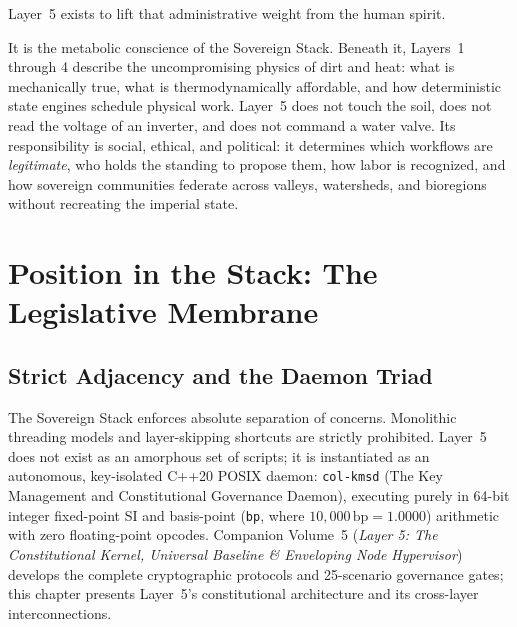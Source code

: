 Layer~5 exists to lift that administrative weight from the human spirit.

It is the metabolic conscience of the Sovereign Stack. Beneath it, Layers~1 through 4 describe the uncompromising physics of dirt and heat: what is mechanically true, what is thermodynamically affordable, and how deterministic state engines schedule physical work. Layer~5 does not touch the soil, does not read the voltage of an inverter, and does not command a water valve. Its responsibility is social, ethical, and political: it determines which workflows are \textit{legitimate}, who holds the standing to propose them, how labor is recognized, and how sovereign communities federate across valleys, watersheds, and bioregions without recreating the imperial state.

\section{Position in the Stack: The Legislative Membrane}
\label{sec:l5-position}

\subsection{Strict Adjacency and the Daemon Triad}

The Sovereign Stack enforces absolute separation of concerns. Monolithic threading models and layer-skipping shortcuts are strictly prohibited. Layer~5 does not exist as an amorphous set of scripts; it is instantiated as an autonomous, key-isolated C++20 POSIX daemon: \texttt{col-kmsd} (The Key Management and Constitutional Governance Daemon), executing purely in 64-bit integer fixed-point SI and basis-point (\texttt{bp}, where $10{,}000\,\mathrm{bp} = 1.0000$) arithmetic with zero floating-point opcodes. Companion Volume~5 (\textit{Layer 5: The Constitutional Kernel, Universal Baseline \& Enveloping Node Hypervisor}) develops the complete cryptographic protocols and 25-scenario governance gates; this chapter presents Layer~5's constitutional architecture and its cross-layer interconnections. 

